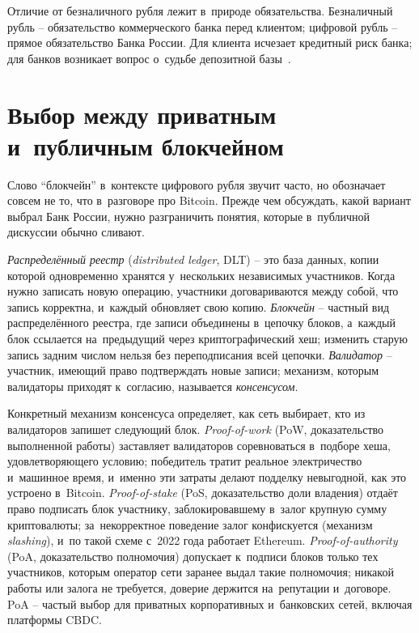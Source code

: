 Отличие от безналичного рубля лежит в~природе обязательства. Безналичный
рубль -- обязательство коммерческого банка перед клиентом; цифровой
рубль -- прямое обязательство Банка России. Для клиента
исчезает кредитный риск банка; для банков возникает вопрос
о~судьбе депозитной базы~\cite{cbr-digital-ruble}.

\section{Выбор между приватным и~публичным блокчейном}\label{sec:cbdc-blockchain-fork}

Слово \enquote{блокчейн} в~контексте цифрового рубля звучит часто,
но обозначает совсем не то, что в~разговоре про Bitcoin. Прежде чем
обсуждать, какой вариант выбрал Банк России, нужно разграничить
понятия, которые в~публичной дискуссии обычно сливают.

\emph{Распределённый реестр} (\textit{distributed ledger},
DLT) -- это база данных, копии которой одновременно хранятся
у~нескольких независимых участников. Когда нужно записать новую
операцию, участники договариваются между собой, что запись корректна,
и~каждый обновляет свою копию. \emph{Блокчейн} -- частный вид
распределённого реестра, где записи объединены в~цепочку блоков,
а~каждый блок ссылается на~предыдущий через криптографический хеш;
изменить старую запись задним числом нельзя без переподписания всей
цепочки. \emph{Валидатор} -- участник, имеющий право подтверждать
новые записи; механизм, которым валидаторы приходят к~согласию,
называется \emph{консенсусом}.

Конкретный механизм консенсуса определяет, как сеть выбирает,
кто из валидаторов запишет следующий блок.
\emph{Proof-of-work} (PoW, доказательство выполненной работы)
заставляет валидаторов соревноваться в~подборе хеша, удовлетворяющего
условию; победитель тратит реальное электричество и~машинное время,
и~именно эти затраты делают подделку невыгодной, как это устроено
в~Bitcoin.
\emph{Proof-of-stake} (PoS, доказательство доли владения) отдаёт
право подписать блок участнику, заблокировавшему в~залог крупную
сумму криптовалюты; за~некорректное поведение залог конфискуется
(механизм \textit{slashing}), и~по такой схеме с~2022 года работает
Ethereum.
\emph{Proof-of-authority} (PoA, доказательство полномочия) допускает
к~подписи блоков только тех участников, которым оператор сети заранее
выдал такие полномочия; никакой работы или залога не требуется,
доверие держится на~репутации и~договоре. PoA -- частый выбор для
приватных корпоративных и~банковских сетей, включая платформы CBDC.

